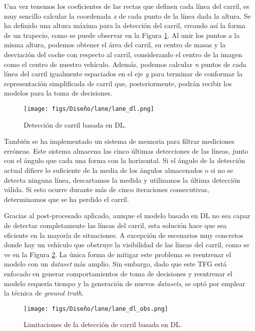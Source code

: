 Una vez tenemos los coeficientes de las rectas que definen cada línea del carril, es muy sencillo calcular la coordenada \textit{x} de cada punto de la línea dada la altura. Se ha definido una altura máxima para la detección del carril, creando así la forma de un trapecio, como se puede observar en la Figura \ref{fig:dl_final_carril}. Al unir los puntos a la misma altura, podemos obtener el área del carril, su centro de masas y la desviación del coche con respecto al carril, considerando el centro de la imagen como el centro de nuestro vehículo. Además, podemos calcular \textit{n} puntos de cada línea del carril igualmente espaciados en el eje \textit{y} para terminar de conformar la representación simplificada de carril que, posteriormente, podrán recibir los modelos para la toma de decisiones.

\begin{figure}[ht]
\centering
\texttt{[image: figs/Diseño/lane/lane\_dl.png]}
\caption{Detección de carril basada en \ac{DL}.}
\label{fig:dl_final_carril}
\end{figure}

También se ha implementado un sistema de memoria para filtrar mediciones erróneas. Este sistema almacena las cinco últimas detecciones de las líneas, junto con el ángulo que cada una forma con la horizontal. Si el ángulo de la detección actual difiere lo suficiente de la media de los ángulos almacenados o si no se detecta ninguna línea, descartamos la medida y utilizamos la última detección válida. Si esto ocurre durante más de cinco iteraciones consecutivas, determinamos que se ha perdido el carril.

Gracias al post-procesado aplicado, aunque el modelo basado en \ac{DL} no sea capaz de detectar completamente las líneas del carril, esta solución hace que sea eficiente en la mayoría de situaciones. A excepción de escenarios muy concretos donde hay un vehículo que obstruye la visibilidad de las líneas del carril, como se ve en la Figura \ref{fig:dl_final_carril_obs}. La única forma de mitigar este problema es reentrenar el modelo con un \textit{dataset} más amplio. Sin embargo, dado que este \ac{TFG} está enfocado en generar comportamientos de toma de decisiones y reentrenar el modelo requería tiempo y la generación de nuevos \textit{datasets}, se optó por emplear la técnica de \textit{ground truth}.
\begin{figure}[ht]
\centering
\texttt{[image: figs/Diseño/lane/lane\_dl\_obs.png]}
\caption{Limitaciones de la detección de carril basada en \ac{DL}.}
\label{fig:dl_final_carril_obs}
\end{figure}


